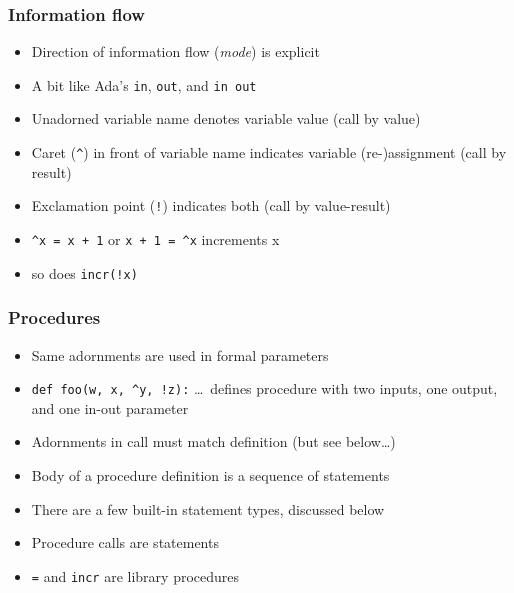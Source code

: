 \documentclass[12pt]{beamer}
\begin{document}
\begin{frame}[fragile]
\frametitle{Information flow}
\begin{itemize}
\item Direction of information flow (\emph{mode}) is explicit
\item A bit like Ada's \texttt{in}, \texttt{out}, and \texttt{in out}
\item Unadorned variable name denotes variable value (call by value)
\item Caret (\texttt{\^}) in front of variable name indicates
  variable (re-)assignment (call by result)
\item Exclamation point (\texttt{!}) indicates both (call by value-result)
\item \texttt{\^{ }x = x + 1} or \texttt{x + 1 = \^{ }x} increments x
\item so does \texttt{incr(!x)}
\end{itemize}
\end{frame}


\begin{frame}[fragile]
\frametitle{Procedures}
\begin{itemize}
\item Same adornments are used in formal parameters
\item \texttt{def foo(w, x, \^{ }y, !z):} \ldots\ defines procedure with two
  inputs, one output, and one in-out parameter
\item Adornments in call must match definition (but see below\ldots)
\item Body of a procedure definition is a sequence of
  statements
\item There are a few built-in statement types, discussed below
\item Procedure calls are statements
\item \texttt{=} and \texttt{incr} are library procedures
\end{itemize}
\end{frame}
\end{document}
